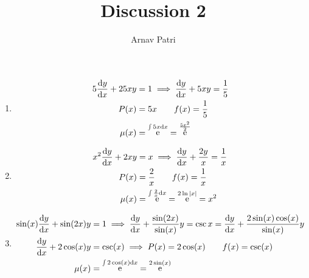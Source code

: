 \documentclass[A4, 12pt]{article}
\title{Discussion 2}
\author{Arnav Patri}
\DeclareMathOperator{\en}{e}
\begin{document}
	\maketitle
		\begin{enumerate}[1)]
			\item
				\begin{align*}
					5\dv{y}{x} + 25xy &= 1 \implies
						\dv{y}{x} + 5xy = \frac{1}{5} \\
					P(x) &= 5x \qquad f(x) = \frac{1}{5} \\
					\mu(x) &= \en^{\int 5x\dd{x}} = \en^{\frac{5x^2}{2}}
				\end{align*}
			\item
				\begin{align*}
					x^2\dv{y}{x} + 2xy &= x \implies
						\dv{y}{x} + \frac{2y}{x} = \frac{1}{x} \\
					P(x) &= \frac{2}{x} \qquad f(x) = \frac{1}{x} \\
					\mu(x) &= \en^{\int \frac{2}{x}\dd{x}} = \en^{2\ln|x|} = x^2
				\end{align*}
			\item
				\begin{align*}
					\sin(x) \dv{y}{x} + \sin(2x)y &= 1 \implies
							\dv{y}{x} + \frac{\sin(2x)}{\sin(x)}y = \csc{x} 
									= \dv{y}{x} + \frac{2\sin(x)\cos(x)}{\sin(x)}
									y \\
					\dv{y}{x} + 2\cos(x)y &= \csc(x) \implies P(x) = 2\cos(x) \qquad f(x) = \csc(x) \\
					\mu(x) &= \en^{\int 2\cos(x)\dd{x}}
							= \en^{2\sin(x)}
				\end{align*}
		\end{enumerate}
\end{document}
